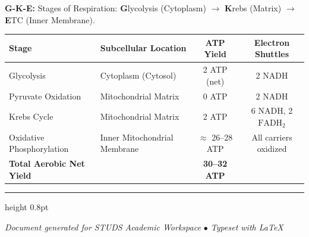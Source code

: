 \documentclass[11pt,a4paper]{article}
\begin{document}
\begin{mnemonicbox}
\textbf{G-K-E:} Stages of Respiration: \textbf{G}lycolysis (Cytoplasm) $\rightarrow$ \textbf{K}rebs (Matrix) $\rightarrow$ \textbf{E}TC (Inner Membrane).
\end{mnemonicbox}

\vspace{12pt}
\begin{center}
\small
\begin{tabular}{@{}llcc@{}}
\toprule
\textbf{Stage} & \textbf{Subcellular Location} & \textbf{ATP Yield} & \textbf{Electron Shuttles} \\ \midrule
Glycolysis & Cytoplasm (Cytosol) & 2 ATP (net) & 2 NADH \\
Pyruvate Oxidation & Mitochondrial Matrix & 0 ATP & 2 NADH \\
Krebs Cycle & Mitochondrial Matrix & 2 ATP & 6 NADH, 2 $\text{FADH}_2$ \\
Oxidative Phosphorylation & Inner Mitochondrial Membrane & $\approx$ 26--28 ATP & All carriers oxidized \\ \midrule
\textbf{Total Aerobic Net Yield} & & \textbf{30--32 ATP} & \\ \bottomrule
\end{tabular}
\end{center}

\vspace{14pt}
\hrule height 0.8pt
\vspace{8pt}
\begin{center}
    \small \textit{Document generated for STUDS Academic Workspace $\bullet$ Typeset with \LaTeX}
\end{center}
\end{document}
